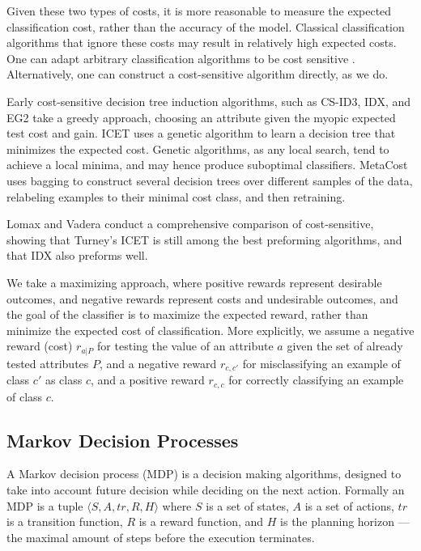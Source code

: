 \documentclass[letterpaper]{article}
\theoremstyle{definition}
\begin{document}
Given these two types of costs, it is more reasonable to measure the expected classification cost, rather than the accuracy of the model. Classical classification algorithms that ignore these costs may result in relatively high expected costs. One can adapt arbitrary classification algorithms to be cost sensitive \cite{zadrozny2003cost,domingos1999metacost}. Alternatively, one can construct a cost-sensitive algorithm directly, as we do.


Early cost-sensitive decision tree induction algorithms, such as CS-ID3, IDX, and EG2 take a greedy approach, choosing an attribute given the myopic expected test cost and gain. ICET \cite{turney1995cost} uses a genetic algorithm to learn a decision tree that minimizes the expected cost. Genetic algorithms, as any local search, tend to achieve a local minima, and may hence produce suboptimal classifiers. MetaCost \cite{domingos1999metacost} uses bagging to construct several decision trees over different samples of the data, relabeling examples to their minimal cost class, and then retraining.

Lomax and Vadera \cite{LomaxV11} conduct a comprehensive comparison of cost-sensitive, showing that Turney's ICET is still among the best preforming algorithms, and that IDX \cite{IDX} also preforms well.

We take a maximizing approach, where positive rewards represent desirable outcomes, and negative rewards represent costs and undesirable outcomes, and the goal of the classifier is to maximize the expected reward, rather than minimize the expected cost of classification.
More explicitly, we assume a negative reward (cost) $r_{a|P}$ for testing the value of an attribute $a$ given the set of already tested attributes $P$, and a negative reward $r_{c,c'}$ for misclassifying an example of class $c'$ as class $c$, and a positive reward $r_{c,c}$ for correctly classifying an example of class $c$. 


\subsection{Markov Decision Processes}

A Markov decision process (MDP) \cite{Bellman,Puterman} is a decision making algorithms, designed to take into account future decision while deciding on the next action. Formally an MDP is a tuple $\langle S,A,tr,R,H \rangle$ where $S$ is a set of states, $A$ is a set of actions, $tr$ is a transition function, $R$ is a reward function, and $H$ is the planning horizon --- the maximal amount of steps before the execution terminates.
\end{document}
